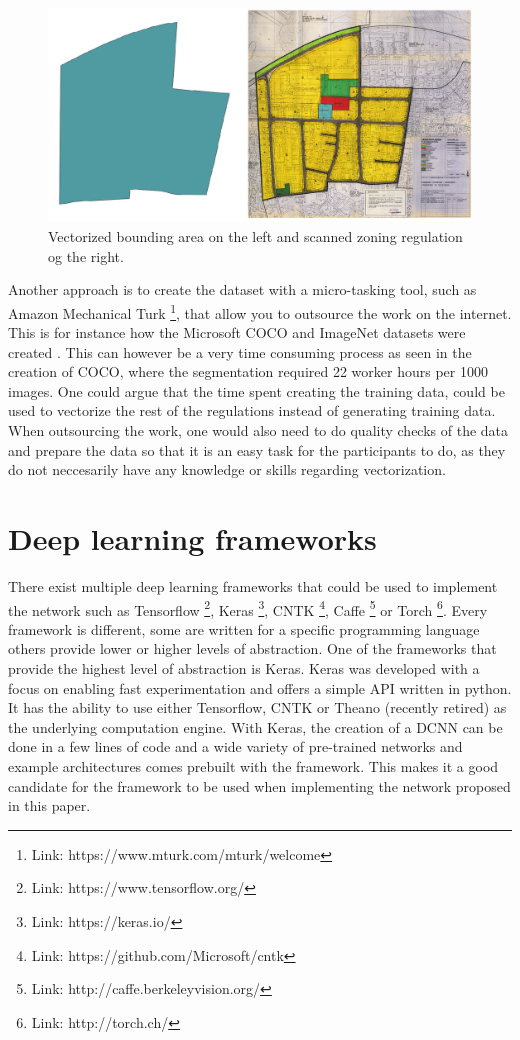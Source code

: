 \begin{figure}[H]
	\centering
	\includegraphics[width=\linewidth]{fig/georef-problem.png}
	\caption{Vectorized bounding area on the left and scanned zoning regulation og the right.}
	\label{fig:georeferencing}
\end{figure}

Another approach is to create the dataset with a micro-tasking tool, such as Amazon Mechanical Turk \footnote{Link: https://www.mturk.com/mturk/welcome}, that allow you to outsource the work on the internet. This is for instance how the Microsoft COCO and ImageNet datasets were created \cite{Lin2014}. This can however be a very time consuming process as seen in the creation of COCO, where the segmentation required 22 worker hours per 1000 images. One could argue that the time spent creating the training data, could be used to vectorize the rest of the regulations instead of generating training data. When outsourcing the work, one would also need to do quality checks of the data and prepare the data so that it is an easy task for the participants to do, as they do not neccesarily have any knowledge or skills regarding vectorization.


\section{Deep learning frameworks}
There exist multiple deep learning frameworks that could be used to implement the network such as Tensorflow \footnote{Link: https://www.tensorflow.org/}, Keras \footnote{Link: https://keras.io/}, CNTK \footnote{Link: https://github.com/Microsoft/cntk}, Caffe \footnote{Link: http://caffe.berkeleyvision.org/} or Torch \footnote{Link: http://torch.ch/}.  Every framework is different, some are written for a specific programming language others provide lower or higher levels of abstraction. One of the frameworks that provide the highest level of abstraction is Keras. Keras was developed with a focus on enabling fast experimentation and offers a simple API written in python. It has the ability to use either Tensorflow, CNTK or Theano (recently retired) as the underlying computation engine. With Keras, the creation of a DCNN can be done in a few lines of code and a wide variety of pre-trained networks and example architectures comes prebuilt with the framework. This makes it a good candidate for the framework to be used when implementing the network proposed in this paper. 


